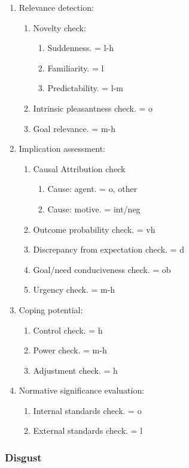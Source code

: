\begin{enumerate}
\item  Relevance detection:
\begin{enumerate}
\item  Novelty check:
\begin{enumerate}
\item  Suddenness. = l-h
\item  Familiarity. = l
\item  Predictability. = l-m
\end{enumerate}
\item  Intrinsic pleasantness check. = o
\item  Goal relevance. = m-h
\end{enumerate}
\item  Implication assessment:
\begin{enumerate}
\item  Causal Attribution check
\begin{enumerate}
\item  Cause: agent. = o, other
\item  Cause: motive. = int/neg
\end{enumerate}
\item  Outcome probability check. = vh
\item  Discrepancy from expectation check. = d
\item  Goal/need conduciveness check. = ob
\item  Urgency check. = m-h
\end{enumerate}
\item  Coping potential:
\begin{enumerate}
\item  Control check. = h
\item  Power check. = m-h
\item  Adjustment check. = h
\end{enumerate}
\item  Normative significance evaluation:
\begin{enumerate}
\item  Internal standards check. = o
\item  External standards check. = l
\end{enumerate}
\end{enumerate}

\subsubsection{Disgust}

